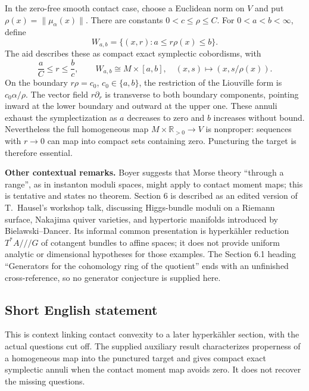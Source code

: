 \documentclass[11pt]{article}
\newcommand{\R}{\mathbb{R}}
\begin{document}
In the zero-free smooth contact case, choose a Euclidean norm on $V$ and put $\rho(x)=\|\mu_\alpha(x)\|$. There are constants $0<c\le\rho\le C$. For $0<a<b<\infty$, define
\[
 W_{a,b}=\{(x,r):a\le r\rho(x)\le b\}.
\]
The aid describes these as compact exact symplectic cobordisms, with
\[
 \frac aC\le r\le\frac bc,\qquad
 W_{a,b}\cong M\times[a,b],\quad
 (x,s)\longmapsto(x,s/\rho(x)).
\]
On the boundary $r\rho=c_0$, $c_0\in\{a,b\}$, the restriction of the Liouville form is $c_0\alpha/\rho$. The vector field $r\partial_r$ is transverse to both boundary components, pointing inward at the lower boundary and outward at the upper one. These annuli exhaust the symplectization as $a$ decreases to zero and $b$ increases without bound. Nevertheless the full homogeneous map $M\times\R_{>0}\to V$ is nonproper: sequences with $r\to0$ can map into compact sets containing zero. Puncturing the target is therefore essential.

\textbf{Other contextual remarks.} Boyer suggests that Morse theory ``through a range'', as in instanton moduli spaces, might apply to contact moment maps; this is tentative and states no theorem. Section 6 is described as an edited version of T.~Hausel's workshop talk, discussing Higgs-bundle moduli on a Riemann surface, Nakajima quiver varieties, and hypertoric manifolds introduced by Bielawski--Dancer. Its informal common presentation is hyperk\"ahler reduction $T^*A\mathbin{///}G$ of cotangent bundles to affine spaces; it does not provide uniform analytic or dimensional hypotheses for those examples. The Section 6.1 heading ``Generators for the cohomology ring of the quotient'' ends with an unfinished cross-reference, so no generator conjecture is supplied here.
\subsection{Short English statement}
This is context linking contact convexity to a later hyperk\"ahler section, with the actual questions cut off. The supplied auxiliary result characterizes properness of a homogeneous map into the punctured target and gives compact exact symplectic annuli when the contact moment map avoids zero. It does not recover the missing questions.
\end{document}
